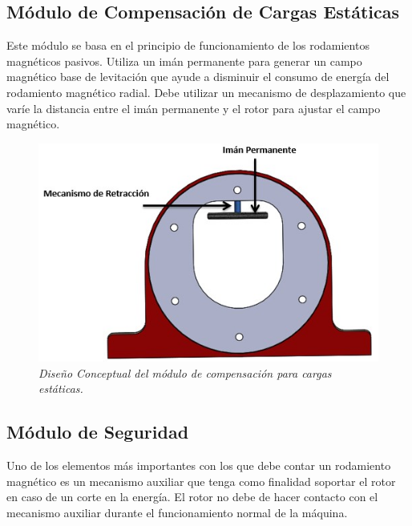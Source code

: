 
\subsection{Módulo de Compensación de Cargas Estáticas}

Este módulo se basa en el principio de funcionamiento de los rodamientos magnéticos pasivos. Utiliza un imán permanente para generar un campo magnético base de levitación que ayude a disminuir el consumo de energía del rodamiento magnético radial. Debe utilizar un mecanismo de desplazamiento que varíe la distancia entre el imán permanente y el rotor para ajustar el campo magnético. 

\begin{figure}[htb]
\centering
	\includegraphics[scale=.70]{images/Capitulo_2/MCCE}
	\caption{\textit{Diseño Conceptual del módulo de compensación para cargas estáticas.}}
	\label{fig:system:example1}
\end{figure}

\subsection{Módulo de Seguridad}

Uno de los elementos más importantes con los que debe contar un rodamiento magnético es un mecanismo auxiliar que tenga como finalidad soportar el rotor en caso de un corte en la energía. El rotor no debe de hacer contacto con el mecanismo auxiliar durante el funcionamiento normal de la máquina.

